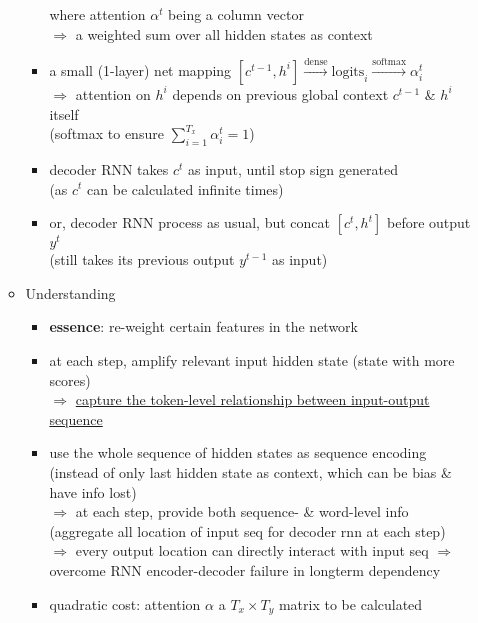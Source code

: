 \begin{itemize}
\begin{itemize}
\begin{itemize}
		where attention $\alpha^t$ being a column vector \\
		$\Rightarrow$ a weighted sum over all hidden states as context
		\item a small (1-layer) net mapping $[c^{t-1}, h^{i}] \xrightarrow[]{\text{dense}} \text{logits}_i \xrightarrow[]{\text{softmax}} \alpha^t_{i}$ \\
		$\Rightarrow$ attention on $h^i$ depends on previous global context $c^{t-1}$ \& $h^i$ itself \\
		(softmax to ensure $\sum_{i=1}^{T_x}\alpha^t_i=1$)
		\item decoder RNN takes $c^{t}$ as input, until stop sign generated \\
		(as $c^t$ can be calculated infinite times)
		\item or, decoder RNN process as usual, but concat $[c^t, h^t]$ before output $y^t$ \\
		(still takes its previous output $y^{t-1}$ as input)
		\end{itemize}
	\item Understanding
		\begin{itemize}
		\item \textbf{essence}: re-weight certain features in the network
		\item at each step, amplify relevant input hidden state (state with more scores) \\
		$\Rightarrow$ \underline{capture the token-level relationship between input-output sequence}
		\item use the whole sequence of hidden states as sequence encoding \\
		(instead of only last hidden state as context, which can be bias \& have info lost) \\
		$\Rightarrow$ at each step, provide both sequence- \& word-level info \\
		(aggregate all location of input seq for decoder rnn at each step) \\
		$\Rightarrow$ every output location can directly interact with input seq
		$\Rightarrow$ overcome RNN encoder-decoder failure in longterm dependency \\
		\item quadratic cost: attention $\alpha$ a $T_x\times T_y$ matrix to be calculated
		\end{itemize}
	\end{itemize}


\end{itemize}
